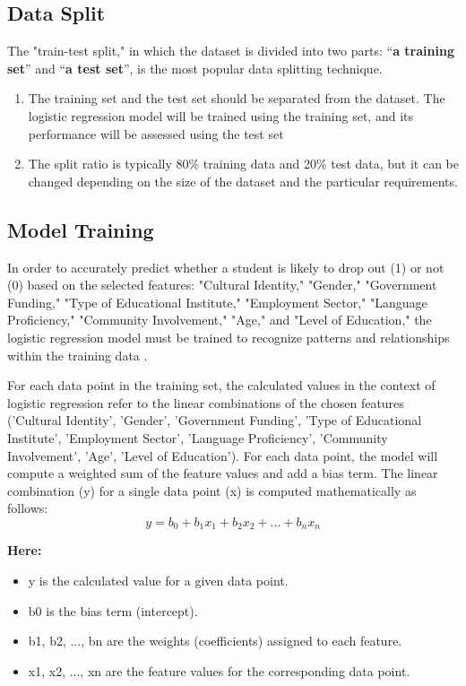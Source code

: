 \documentclass[conference]{IEEEtran}
\begin{document}
\subsection{\textbf{Data Split}}
The "train-test split," in which the dataset is divided into two parts: “\textbf{a training set}” and  “\textbf{a test set}”, is the most popular data splitting technique.
\begin{enumerate}
  \item The training set and the test set should be separated from the dataset. The logistic regression model will be trained using the training set, and its performance will be assessed using the test set
  \item The split ratio is typically 80\% training data and 20\% test data, but it can be changed depending on the size of the dataset and the particular requirements.
\end{enumerate}

\subsection{\textbf{Model Training}}

In order to accurately predict whether a student is likely to drop out (1) or not (0) based on the selected features: "Cultural Identity," "Gender," "Government Funding," "Type of Educational Institute," "Employment Sector," "Language Proficiency," "Community Involvement," "Age," and "Level of Education," the logistic regression model must be trained to recognize patterns and relationships within the training data \cite{r18}.

For each data point in the training set, the calculated values in the context of logistic regression refer to the linear combinations of the chosen features ('Cultural Identity', 'Gender', 'Government Funding', 'Type of Educational Institute', 'Employment Sector', 'Language Proficiency', 'Community Involvement', 'Age', 'Level of Education'). For each data point, the model will compute a weighted sum of the feature values and add a bias term. The linear combination (y) for a single data point (x) is computed mathematically as follows:\\
\begin{equation}
y = b_0 + b_1 x_1 + b_2 x_2 + \ldots + b_n x_n
\end{equation}

\textbf{Here:}
\begin{itemize}
  \item y is the calculated value for a given data point.
  \item b0 is the bias term (intercept).
  \item b1, b2, ..., bn are the weights (coefficients) assigned to each feature.
  \item x1, x2, ..., xn are the feature values for the corresponding data point.
\end{itemize}
\end{document}
